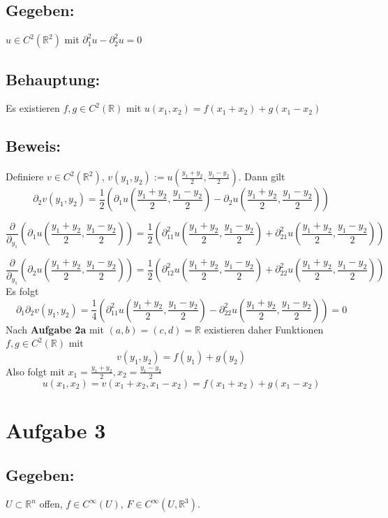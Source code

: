 \documentclass[a4paper, 12pt]{article} %
\begin{document}
\begin{flushleft}
    \subsection*{Gegeben:}
    $u \in C^2(\mathbb{R}^2)$ mit $\partial^2_1u - \partial^2_2u = 0$

    \subsection*{Behauptung:}
    Es existieren $f, g \in C^2(\mathbb{R})$ mit $u(x_1,x_2) = f(x_1+x_2)+g(x_1-x_2)$

    \subsection*{Beweis:}
    Definiere $v \in C^2(\mathbb{R}^2)$,
    $v(y_1,y_2) := u(\frac{y_1+y_2}{2},\frac{y_1-y_2}{2})$. Dann gilt
    $$
        \partial_2 v(y_1,y_2) = \frac{1}{2} \left ( \partial_1 u(\frac{y_1+y_2}{2},\frac{y_1-y_2}{2})
        - \partial_2 u(\frac{y_1+y_2}{2},\frac{y_1-y_2}{2}) \right )
    $$

    $$
        \frac{\partial}{\partial_{y_1}} \left (\partial_1 u(\frac{y_1+y_2}{2},\frac{y_1-y_2}{2}) \right )
        = \frac{1}{2} \left ( \partial^2_{11} u(\frac{y_1+y_2}{2},\frac{y_1-y_2}{2})
        + \partial^2_{21} u(\frac{y_1+y_2}{2},\frac{y_1-y_2}{2}) \right )
    $$

    $$
        \frac{\partial}{\partial_{y_1}} \left (\partial_2 u(\frac{y_1+y_2}{2},\frac{y_1-y_2}{2}) \right )
        = \frac{1}{2} \left ( \partial^2_{12} u(\frac{y_1+y_2}{2},\frac{y_1-y_2}{2})
        + \partial^2_{22} u(\frac{y_1+y_2}{2},\frac{y_1-y_2}{2}) \right )
    $$
    Es folgt
    $$
        \partial_1\partial_2 v(y_1,y_2) = \frac{1}{4} \left ( \partial^2_{11} u(\frac{y_1+y_2}{2},\frac{y_1-y_2}{2})
        - \partial^2_{22} u(\frac{y_1+y_2}{2},\frac{y_1-y_2}{2}) \right )
        = 0
    $$
    Nach \textbf{Aufgabe 2a} mit $(a,b)=(c,d)= \mathbb{R}$ existieren daher
    Funktionen $f, g \in C^2(\mathbb{R})$ mit
    $$
        v(y_1,y_2)= f(y_1)+g(y_2)
    $$
    Also folgt mit $x_1=\frac{y_1+y_2}{2}, x_2=\frac{y_1-y_2}{2}$
    $$
        u(x_1,x_2)=v(x_1+x_2,x_1-x_2)=f(x_1+x_2)+g(x_1-x_2)
    $$

    \QEDB

    \section*{Aufgabe 3}

    \subsection*{Gegeben:}
    $U \subset \mathbb{R}^n$ offen, $f \in C^\infty(U)$, $F \in C^\infty(U, \mathbb{R}^3)$.


\end{flushleft}
\end{document}
